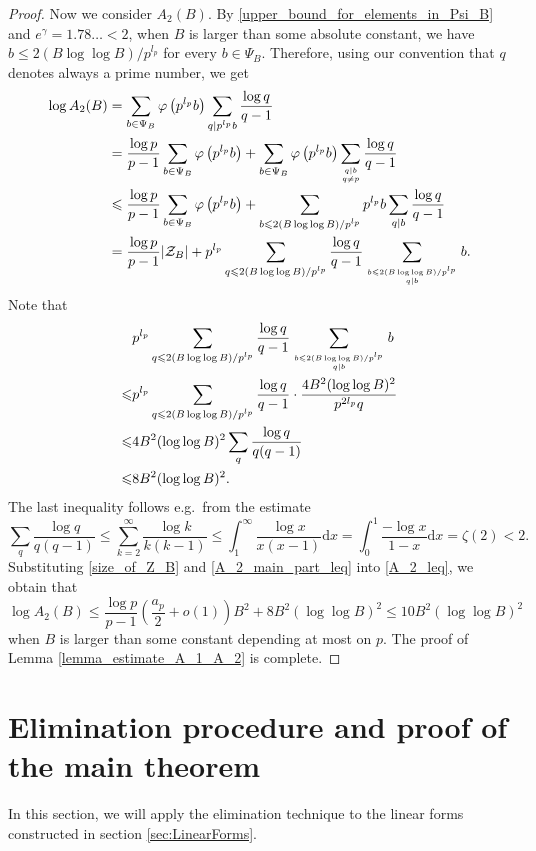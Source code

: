 \documentclass[12pt]{article}
\numberwithin{equation}{section}
\begin{document}
\begin{proof}
Now we consider $A_2(B)$. By \eqref{upper_bound_for_elements_in_Psi_B} and $e^\gamma = 1.78\ldots < 2$, when $B$ is larger than some absolute constant, we have $b \leqslant 2(B\log\log B)/p^{l_p}$ for every $b \in \Psi_B$.  Therefore, using our convention that $q$ denotes always a prime number, we get
\begin{align}
	\log A_2(B) &= \sum_{b \in \Psi_B} \varphi\left(p^{l_p}b\right) \sum_{q \mid p^{l_p}b} \frac{\log q}{q-1} \notag\\
	&= \frac{\log p}{p-1}\sum_{b \in \Psi_B} \varphi\left(p^{l_p}b\right) + \sum_{b \in \Psi_B} \varphi\left(p^{l_p}b\right) \sum_{q \mid b \atop q \neq p} \frac{\log q}{q-1} \notag\\
	&\leqslant \frac{\log p}{p-1}\sum_{b \in \Psi_B} \varphi\left(p^{l_p}b\right) + \sum_{b \leqslant 2(B\log\log B)/p^{l_p}} p^{l_p}b \sum_{q \mid b} \frac{\log q}{q-1} \notag\\
	&= \frac{\log p}{p-1}|\mathcal{Z}_B| + p^{l_p}\sum_{q \leqslant 2(B\log\log B)/p^{l_p}} \frac{\log q}{q-1} \sum_{b \leqslant 2(B\log\log B)/p^{l_p} \atop q \mid b} b. \label{A_2_leq}
\end{align}
Note that
\begin{align}
	&p^{l_p}\sum_{q \leqslant 2(B\log\log B)/p^{l_p}} \frac{\log q}{q-1} \sum_{b \leqslant 2(B\log\log B)/p^{l_p} \atop q \mid b} b \notag\\
	\leqslant& p^{l_p}\sum_{q \leqslant 2(B\log\log B)/p^{l_p}} \frac{\log q}{q-1} \cdot \frac{4B^2(\log\log B)^2}{p^{2l_p}q} \notag\\
	\leqslant& 4B^2(\log\log B)^2 \sum_{q} \frac{\log q}{q(q-1)} \notag\\
	\leqslant& 8B^2(\log\log B)^2. \label{A_2_main_part_leq}
\end{align}
The last inequality follows e.g.\ from the estimate
\[
\sum_{q} \frac{\log q}{q(q-1)}\leqslant \sum_{k=2}^\infty \frac{\log k}{k(k-1)}\leqslant \int_1^\infty \frac{\log x}{x(x-1)}\mathrm{d}x=\int_0^1 \frac{-\log x}{1-x}\mathrm{d}x =\zeta(2)< 2.
\]
Substituting \eqref{size_of_Z_B} and \eqref{A_2_main_part_leq} into \eqref{A_2_leq}, we obtain that
\[ \log A_2(B) \leqslant \frac{\log p}{p-1}\left(\frac{a_p}{2} + o(1)\right)B^2 + 8B^2(\log\log B)^2 \leqslant 10B^2(\log\log B)^2 \]
when $B$ is larger than some constant depending at most on $p$. The proof of Lemma \ref{lemma_estimate_A_1_A_2} is complete.
\end{proof}


\section{Elimination procedure and proof of the main theorem}\label{sec:MainThm}
In this section, we will apply the elimination technique to the linear forms constructed in section \ref{sec:LinearForms}. 
\end{document}
